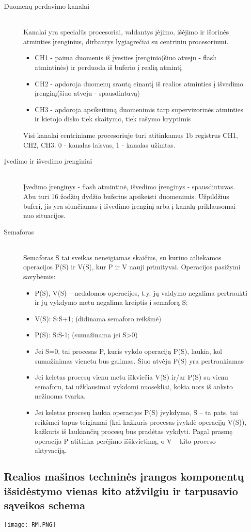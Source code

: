 \begin{description}
  \item[Duomenų perdavimo kanalai] \leavevmode \\
Kanalai yra specialūs procesoriai, valdantys įėjimo, išėjimo ir išorinės atminties įrenginius, dirbantys lygiagrečiai su centriniu procesoriumi.
\begin{itemize}
  \item CH1 - paima duomenis iš įvesties įrenginio(šiuo atveju - flash atmintinės) ir perduoda iš buferio į realią atmintį
  \item CH2 - apdoroja duomenų srautą einantį iš realios atminties į išvedimo įrenginį(šiuo atveju - spausdintuvą)
  \item CH3 - apdoroja apsikeitimą duomenimis tarp supervizorinės atminties ir kietojo disko tiek skaitymo, tiek rašymo kryptimis
\end{itemize}
Visi kanalai centriniame procesoriuje turi atitinkamus 1b registrus CH1, CH2, CH3. 0 - kanalas laisvas, 1 - kanalas užimtas.

  \item[Įvedimo ir išvedimo įrenginiai] \leavevmode \\
Įvedimo įrenginys - flash atmintinė, išvedimo įrenginys - spausdintuvas. Abu turi 16 žodžių dydžio buferius apsikeisti duomenimis. Užpildžius buferį, jis yra siunčiamas
į išvedimo įrenginį arba į kanalą priklausomai nuo situacijos.

  \item[Semaforas] \leavevmode \\
Semaforas S tai sveikas neneigiamas skaičius, su kuriuo atliekamos operacijos P(S) ir V(S), kur P ir V nauji primityvai. Operacijos pasižymi savybėmis:
\begin{itemize}
\item P(S), V(S) – nedalomos operacijos, t.y. jų valdymo negalima pertraukti ir jų vykdymo metu negalima kreiptis į semaforą S;
\item V(S):     S:S+1; (didinama semaforo reikšmė)
\item P(S):      S:S-1; (sumažinama jei S>0)
\item Jei S=0, tai procesas P, kuris vykdo operaciją P(S), laukia, kol sumažinimas vienetu bus galimas. Šiuo atvėju P(S) yra pertraukiamas
\item Jei keletas procesų vienu metu iškviečia V(S) ir/ar P(S) su vienu semaforu, tai užklausimai vykdomi nuosekliai, kokia nors iš anksto nežinoma tvarka.
\item Jei keletas procesų laukia operacijos P(S) įvykdymo, S – ta pats, tai reikšmei tapus teigiamai (kai kažkuris procesas įvykdė operaciją V(S)), kažkuris iš laukiančių procesų bus pradėtas vykdyti.
Pagal prasmę operacija P atitinka perėjimo išškvietimą, o V – kito proceso aktyvaciją.
\end{itemize}

\end{description}

\subsection{Realios mašinos techninės įrangos komponentų išsidėstymo vienas kito atžvilgiu ir tarpusavio sąveikos schema}
\texttt{[image: RM.PNG]}

\newpage
